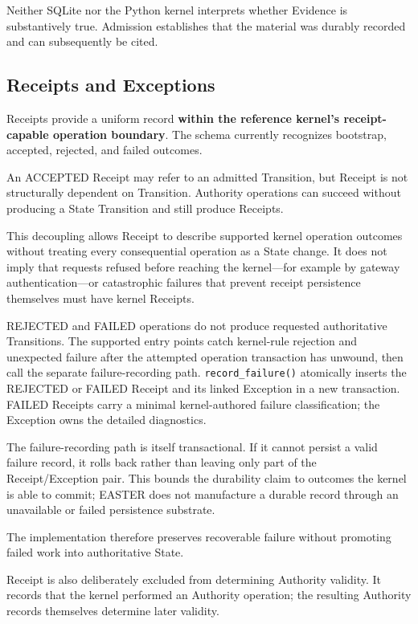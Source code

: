 \documentclass[11pt]{article}
\begin{document}
Neither SQLite nor the Python kernel interprets whether Evidence is substantively true. Admission establishes that the material was durably recorded and can subsequently be cited.

\subsection{Receipts and Exceptions}

Receipts provide a uniform record \textbf{within the reference kernel's receipt-capable operation boundary}. The schema currently recognizes bootstrap, accepted, rejected, and failed outcomes.

An ACCEPTED Receipt may refer to an admitted Transition, but Receipt is not structurally dependent on Transition. Authority operations can succeed without producing a State Transition and still produce Receipts.

This decoupling allows Receipt to describe supported kernel operation outcomes without treating every consequential operation as a State change. It does not imply that requests refused before reaching the kernel---for example by gateway authentication---or catastrophic failures that prevent receipt persistence themselves must have kernel Receipts.

REJECTED and FAILED operations do not produce requested authoritative Transitions. The supported entry points catch kernel-rule rejection and unexpected failure after the attempted operation transaction has unwound, then call the separate failure-recording path. \texttt{record\_failure()} atomically inserts the REJECTED or FAILED Receipt and its linked Exception in a new transaction. FAILED Receipts carry a minimal kernel-authored failure classification; the Exception owns the detailed diagnostics.

The failure-recording path is itself transactional. If it cannot persist a valid failure record, it rolls back rather than leaving only part of the Receipt/Exception pair. This bounds the durability claim to outcomes the kernel is able to commit; EASTER does not manufacture a durable record through an unavailable or failed persistence substrate.

The implementation therefore preserves recoverable failure without promoting failed work into authoritative State.

Receipt is also deliberately excluded from determining Authority validity. It records that the kernel performed an Authority operation; the resulting Authority records themselves determine later validity.
\end{document}

